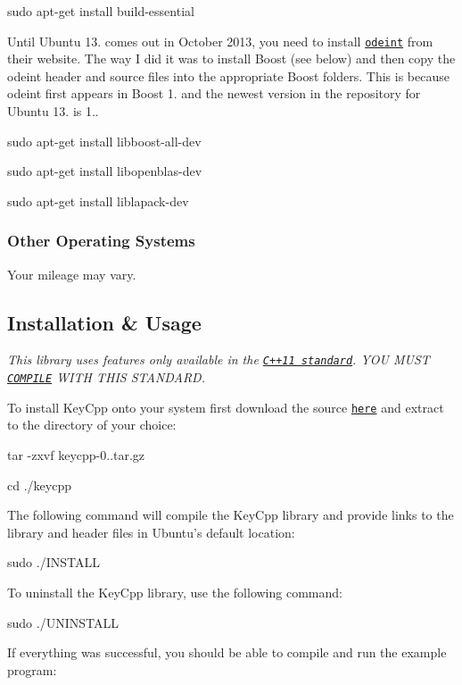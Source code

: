 {\ttfamily sudo apt-\/get install build-\/essential}

Until Ubuntu 13. comes out in October 2013, you need to install \href{http://headmyshoulder.github.io/odeint-v2/}{\tt odeint} from their website. The way I did it was to install Boost (see below) and then copy the odeint header and source files into the appropriate Boost folders. This is because odeint first appears in Boost 1. and the newest version in the repository for Ubuntu 13. is 1..

{\ttfamily sudo apt-\/get install libboost-\/all-\/dev}

{\ttfamily sudo apt-\/get install libopenblas-\/dev}

{\ttfamily sudo apt-\/get install liblapack-\/dev}

\subsubsection*{Other Operating Systems}

Your mileage may vary.

\subsection*{Installation \& Usage}

{\itshape This library uses features only available in the \href{https://en.wikipedia.org/wiki/C%2B%2B11}{\tt C++11 standard}. Y\-O\-U M\-U\-S\-T \href{http://gcc.gnu.org/projects/cxx0x.html}{\tt C\-O\-M\-P\-I\-L\-E} W\-I\-T\-H T\-H\-I\-S S\-T\-A\-N\-D\-A\-R\-D.}

To install Key\-Cpp onto your system first download the source \href{keycpp-0.1.tar.gz}{\tt here} and extract to the directory of your choice\-:

{\ttfamily tar -\/zxvf keycpp-\/0..\-tar.\-gz}

{\ttfamily cd ./keycpp}

The following command will compile the Key\-Cpp library and provide links to the library and header files in Ubuntu's default location\-:

{\ttfamily sudo ./\-I\-N\-S\-T\-A\-L\-L}

To uninstall the Key\-Cpp library, use the following command\-:

{\ttfamily sudo ./\-U\-N\-I\-N\-S\-T\-A\-L\-L}

If everything was successful, you should be able to compile and run the example program\-:


